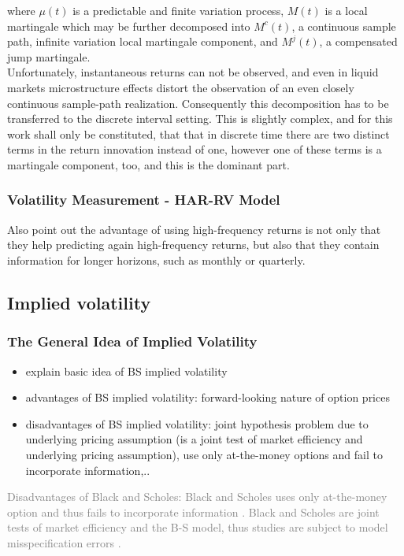 where $\mu(t)$ is a predictable and finite variation process, $M(t)$ is a local martingale which may be further decomposed into $M^{c}(t)$, a continuous sample path, infinite variation local martingale component, and $M^{j}(t)$, a compensated jump martingale.\\
Unfortunately, instantaneous returns can not be observed, and even in liquid markets microstructure effects distort the observation of an even closely continuous sample-path realization. Consequently this decomposition has to be transferred to the discrete interval setting. This is slightly complex, and for this work shall only be constituted, that that in discrete time there are two distinct terms in the return innovation instead of one, however one of these terms is a martingale component, too, and this is the dominant part. \\




\subsubsection{Volatility Measurement - HAR-RV Model}

Also \citeauthor{andersen2003} point out the advantage of using high-frequency returns is not only that they help predicting again high-frequency returns, but also that they contain information for longer horizons, such as monthly or quarterly. 


\subsection{Implied volatility}
\subsubsection{The General Idea of Implied Volatility}
\begin{itemize}\itemsep0pt
\item explain basic idea of BS implied volatility
\item advantages of BS implied volatility: forward-looking nature of option prices
\item disadvantages of BS implied volatility: joint hypothesis problem due to underlying  pricing assumption (is a joint test of market efficiency and underlying pricing assumption), use only at-the-money options and fail to incorporate information,..
\end{itemize}

\textcolor{gray}{
Disadvantages of Black and Scholes: Black and Scholes uses only at-the-money option and thus fails to incorporate information \parencite{jiang2003}.
Black and Scholes are joint tests of market efficiency and the B-S model, thus studies are subject to model misspecification errors \parencite{jiang2003}.}

